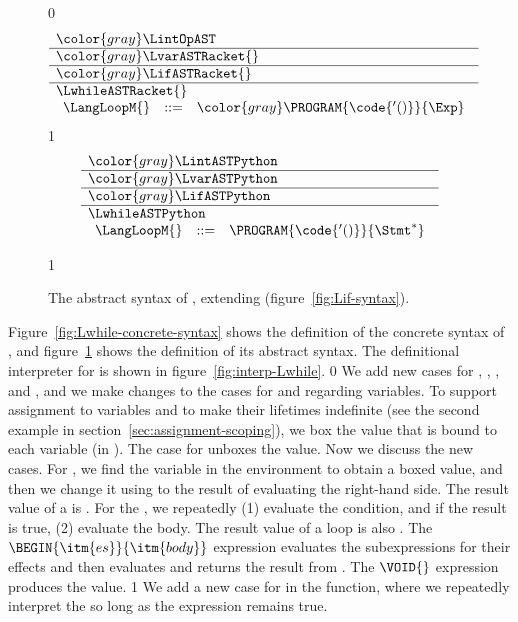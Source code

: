 \documentclass[7x10]{TimesAPriori_MIT}%
\newcommand{\gray}[1]{{\color{gray} #1}}
\def\racketEd{0}
\def\pythonEd{1}
\def\edition{0}
\newcommand{\python}[1]{{\if\edition\pythonEd #1\fi}}
\numberwithin{theorem}{chapter}
\numberwithin{definition}{chapter}
\numberwithin{equation}{chapter}
\begin{document}
\begin{figure}[tp]
\centering
\begin{tcolorbox}[colback=white]
    \small
{\if\edition\racketEd    
\[
\begin{array}{l}
  \gray{\LintOpAST} \\ \hline
  \gray{\LvarASTRacket{}} \\ \hline
  \gray{\LifASTRacket{}} \\ \hline
  \LwhileASTRacket{} \\
\begin{array}{lcl}
  \LangLoopM{} &::=& \gray{ \PROGRAM{\code{'()}}{\Exp} }
\end{array}
\end{array}
\]
\fi}
{\if\edition\pythonEd
\[
\begin{array}{l}
  \gray{\LintASTPython} \\ \hline
  \gray{\LvarASTPython}  \\ \hline
  \gray{\LifASTPython} \\ \hline
  \LwhileASTPython \\
\begin{array}{lcl}
\LangLoopM{} &::=& \PROGRAM{\code{'()}}{\Stmt^{*}}
\end{array}
\end{array}
\]
\fi}
\end{tcolorbox}
\python{
  }
\caption{The abstract syntax of \LangLoop{}, extending \LangIf{} (figure~\ref{fig:Lif-syntax}).}
\label{fig:Lwhile-syntax}
\end{figure}

Figure~\ref{fig:Lwhile-concrete-syntax} shows the definition of the
concrete syntax of \LangLoop{}, and figure~\ref{fig:Lwhile-syntax}
shows the definition of its abstract syntax.
%
The definitional interpreter for \LangLoop{} is shown in
figure~\ref{fig:interp-Lwhile}.
%
{\if\edition\racketEd    
%
We add new cases for , , ,
and , and we make changes to the cases for  and
 regarding variables. To support assignment to variables and
to make their lifetimes indefinite (see the second example in
section~\ref{sec:assignment-scoping}), we box the value that is bound
to each variable (in ). The case for  unboxes the
value.
%
Now we discuss the new cases. For , we find the
variable in the environment to obtain a boxed value, and then we change
it using  to the result of evaluating the right-hand
side.  The result value of a  is .
%
For the , we repeatedly (1) evaluate the condition, and
if the result is true, (2) evaluate the body.
The result value of a  loop is also .
%
The $\BEGIN{\itm{es}}{\itm{body}}$ expression evaluates the
subexpressions  for their effects and then evaluates
and returns the result from .
%
The $\VOID{}$ expression produces the  value.
%
\fi}
{\if\edition\pythonEd
%
We add a new case for  in the 
function, where we repeatedly interpret the  so long as the
 expression remains true.
%
\fi}
\end{document}
